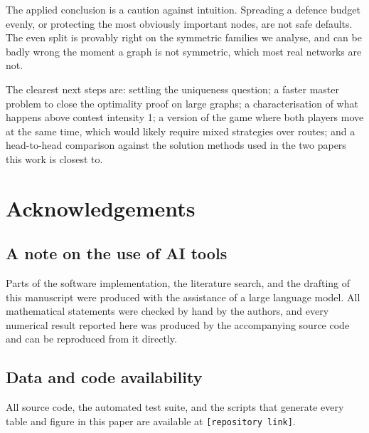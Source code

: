 \documentclass[11pt,a4paper]{article}
\theoremstyle{plain}
\theoremstyle{definition}
\begin{document}
The applied conclusion is a caution against intuition. Spreading a
defence budget evenly, or protecting the most obviously important nodes,
are not safe defaults. The even split is provably right on the symmetric
families we analyse, and can be badly wrong the moment a graph is not
symmetric, which most real networks are not.

The clearest next steps are: settling the uniqueness question; a faster
master problem to close the optimality proof on large graphs; a
characterisation of what happens above contest intensity 1; a version of
the game where both players move at the same time, which would likely
require mixed strategies over routes; and a head-to-head comparison
against the solution methods used in the two papers this work is closest
to.

\section*{Acknowledgements}

\subsection*{A note on the use of AI tools}
Parts of the software implementation, the literature search, and the
drafting of this manuscript were produced with the assistance of a large
language model. All mathematical statements were checked by hand by the
authors, and every numerical result reported here was produced by the
accompanying source code and can be reproduced from it directly.

\subsection*{Data and code availability}
All source code, the automated test suite, and the scripts that generate
every table and figure in this paper are available at
\texttt{[repository link]}.
\end{document}
